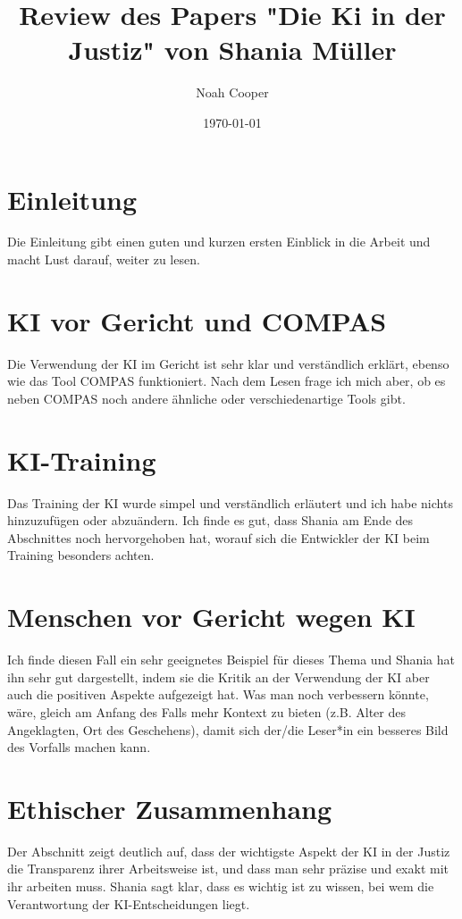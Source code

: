 \documentclass{article}
\title{Review des Papers "Die Ki in der Justiz" von Shania Müller}
\author{Noah Cooper}
\date{\today}
\begin{document}
\maketitle


\tableofcontents
\newpage

\section{Einleitung}
    Die Einleitung gibt einen guten und kurzen ersten Einblick in die Arbeit und macht Lust darauf, weiter zu lesen.

\section{KI vor Gericht und COMPAS}
    Die Verwendung der KI im Gericht ist sehr klar und verständlich erklärt, ebenso wie das Tool COMPAS funktioniert.
    \newline Nach dem Lesen frage ich mich aber, ob es neben COMPAS noch andere ähnliche oder verschiedenartige Tools gibt. 

\section{KI-Training}
    Das Training der KI wurde simpel und verständlich erläutert und ich habe nichts hinzuzufügen oder abzuändern. Ich finde es gut, dass Shania am Ende des Abschnittes noch hervorgehoben hat, worauf sich die Entwickler der KI beim Training besonders achten.

\section{Menschen vor Gericht wegen KI}
    Ich finde diesen Fall ein sehr geeignetes Beispiel für dieses Thema und Shania hat ihn sehr gut dargestellt, indem sie die Kritik an der Verwendung der KI aber auch die positiven Aspekte aufgezeigt hat.
    \newline Was man noch verbessern könnte, wäre, gleich am Anfang des Falls mehr Kontext zu bieten (z.B. Alter des Angeklagten, Ort des Geschehens), damit sich der/die Leser*in ein besseres Bild des Vorfalls machen kann.

\section{Ethischer Zusammenhang}
    Der Abschnitt zeigt deutlich auf, dass der wichtigste Aspekt der KI in der Justiz die Transparenz ihrer Arbeitsweise ist, und dass man sehr präzise und exakt mit ihr arbeiten muss. Shania sagt klar, dass es wichtig ist zu wissen, bei wem die Verantwortung der KI-Entscheidungen liegt.
\end{document}
